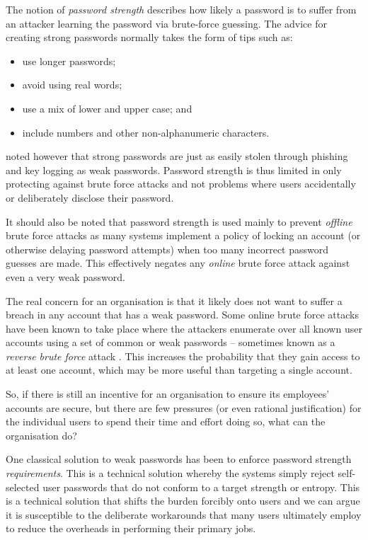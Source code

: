\documentclass{report}
\begin{document}
The notion of \emph{password strength} describes how likely
a password is to suffer from an attacker learning the password via brute-force
guessing. The advice for creating strong passwords normally takes the form of tips
such as:

\begin{itemize}
  \item use longer passwords;
  \item avoid using real words;
  \item use a mix of lower and upper case; and
  \item include numbers and other non-alphanumeric characters.
\end{itemize}

\textcite{florencio2007large} noted however that strong passwords are just
as easily stolen through phishing and key logging as weak
passwords. Password strength is thus limited in only protecting against
brute force attacks and not problems where users accidentally
or deliberately disclose their password.

It should also be noted that password strength is
used mainly to prevent
\emph{offline} brute force attacks as many systems
implement a policy of locking an account (or otherwise
delaying password attempts) when too many incorrect
password guesses are made. This effectively negates any
\emph{online} brute force attack against even a very weak
password.

The real concern for an organisation
is that it likely does not want to suffer
a breach in any account that has a weak password. Some
online brute force attacks have been known to take place
where the attackers enumerate over all known user accounts
using a set of common or weak passwords -- sometimes known
as a \emph{reverse brute force} attack \parencite{khan2010comparative}.
This increases
the probability that they gain access to at least one
account, which may be more useful than targeting a single
account.

So, if there is still an incentive for an organisation
to ensure its employees' accounts are secure, but there
are few pressures (or even rational justification)
for the individual users to spend their time and effort doing
so, what can the organisation do?

One classical solution to weak passwords
has been to enforce password strength \emph{requirements}.
This is a technical solution whereby the systems simply
reject self-selected user passwords that do not conform
to a target strength or entropy.
This is a technical solution that shifts the burden forcibly onto
users and we can argue it is susceptible to the deliberate workarounds
that many users ultimately employ to reduce the overheads
in performing their primary jobs.
\end{document}
